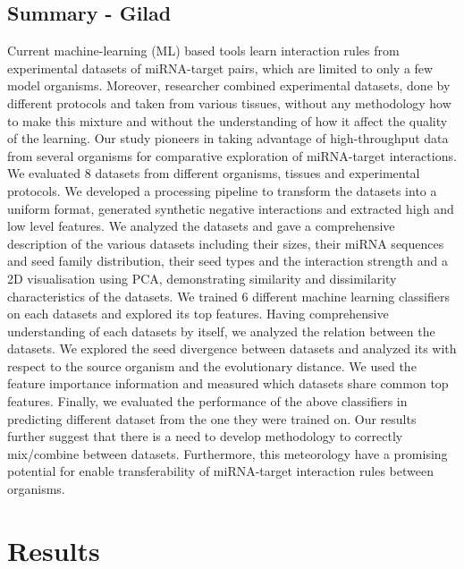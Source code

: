 \documentclass{bmcart}
\begin{document}
\subsection*{Summary - Gilad}
Current machine-learning (ML) based tools learn interaction rules from experimental datasets of miRNA-target pairs, which are limited to only a few model organisms. Moreover, researcher combined experimental datasets, done by different protocols and  taken from various tissues, without any methodology how to make this mixture and without the understanding of how it affect the quality of the learning. 
Our study pioneers in taking advantage of high-throughput data from several organisms for comparative exploration of miRNA-target interactions. We evaluated 8 datasets from different organisms, tissues and experimental protocols. We developed a processing pipeline to transform the datasets into a uniform format, generated synthetic negative interactions and extracted high and low level features. We analyzed the datasets and gave a comprehensive description of the various datasets including their sizes, their miRNA sequences and seed family distribution, their seed types and the interaction strength and a 2D visualisation using PCA, demonstrating similarity and dissimilarity characteristics of the datasets. We trained 6 different machine learning classifiers on each datasets and explored its top features.
Having comprehensive understanding of each datasets by itself, we analyzed the relation between the datasets. We explored the seed divergence between datasets and analyzed its with respect to the source organism and the evolutionary distance. We used the feature importance information and measured which datasets share common top features. Finally, we evaluated the performance of the above classifiers in predicting different dataset from the one they were trained on. 
Our results further suggest that there is a need to develop methodology to correctly mix/combine between datasets. Furthermore, this meteorology have a promising potential for enable transferability of miRNA-target interaction rules between organisms. 










\section*{Results}
\end{document}
